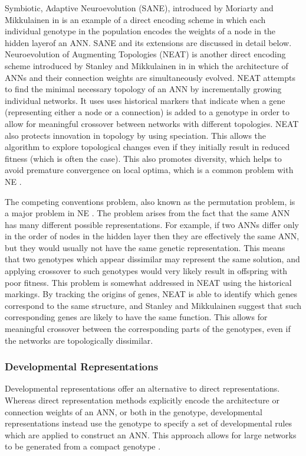 \documentclass[12pt]{article} %
\begin{document}
Symbiotic, Adaptive Neuroevolution (SANE), introduced by Moriarty and Mikkulainen in \cite{Moriarty1996} is an example of a direct encoding scheme in which each individual genotype in the population encodes the weights of a node in the hidden layerof an ANN. SANE and its extensions are discussed in detail below. Neuroevolution of Augmenting Topologies (NEAT) is another direct encoding scheme introduced by Stanley and Mikkulainen in \cite{Stanley2002} in which the architecture of ANNs and their connection weights are simultaneously evolved. NEAT attempts to find the minimal necessary topology of an ANN by incrementally growing individual networks. It uses uses historical markers that indicate when a gene (representing either a node or a connection) is added to a genotype in order to allow for meaningful crossover between networks with different topologies. NEAT also protects innovation in topology by using speciation. This allows the algorithm to explore topological changes even if they initially result in reduced fitness (which is often the case). This also promotes diversity, which helps to avoid premature convergence on local optima, which is a common problem with NE \cite{Floreano2008}\cite{Moriarty1996}. 

The competing conventions problem, also known as the permutation problem, is a major problem in NE \cite{Floreano2008}\cite{Stanley2002}\cite{Yao1999}. The problem arises from the fact that the same ANN has many different possible representations. For example, if two ANNs differ only in the order of nodes in the hidden layer then they are effectively the same ANN, but they would usually not have the same genetic representation. This means that two genotypes which appear dissimilar may represent the same solution, and applying crossover to such genotypes would very likely result in offspring with poor fitness. This problem is somewhat addressed in NEAT using the historical markings. By tracking the origins of genes, NEAT is able to identify which genes correspond to the same structure, and Stanley and Mikkulainen suggest that such corresponding genes are likely to have the same function. This allows for meaningful crossover between the corresponding parts of the genotypes, even if the networks are topologically dissimilar.

\subsubsection{Developmental Representations}

Developmental representations offer an alternative to direct representations. Whereas direct representation methods explicitly encode the architecture or connection weights of an ANN, or both in the genotype, developmental representations instead use the genotype to specify a set of developmental rules which are applied to construct an ANN. This approach allows for large networks to be generated from a compact genotype \cite{Floreano2008}\cite{Yao1999}.
\end{document}
